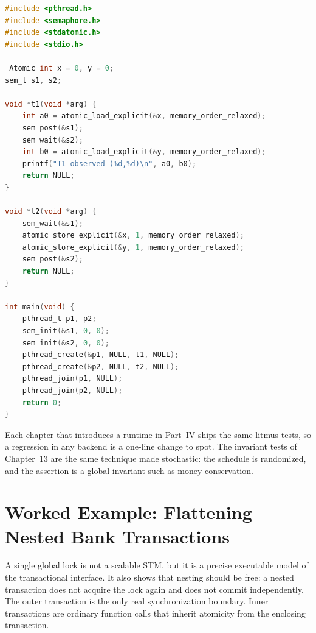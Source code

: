 \begin{lstlisting}[language=C, caption={A minimal litmus-test harness for the
serializable-but-not-opaque history. The schedule is fixed by two semaphores.},
label={lst:litmus-harness}]
#include <pthread.h>
#include <semaphore.h>
#include <stdatomic.h>
#include <stdio.h>

_Atomic int x = 0, y = 0;
sem_t s1, s2;

void *t1(void *arg) {
    int a0 = atomic_load_explicit(&x, memory_order_relaxed);
    sem_post(&s1);
    sem_wait(&s2);
    int b0 = atomic_load_explicit(&y, memory_order_relaxed);
    printf("T1 observed (%d,%d)\n", a0, b0);
    return NULL;
}

void *t2(void *arg) {
    sem_wait(&s1);
    atomic_store_explicit(&x, 1, memory_order_relaxed);
    atomic_store_explicit(&y, 1, memory_order_relaxed);
    sem_post(&s2);
    return NULL;
}

int main(void) {
    pthread_t p1, p2;
    sem_init(&s1, 0, 0);
    sem_init(&s2, 0, 0);
    pthread_create(&p1, NULL, t1, NULL);
    pthread_create(&p2, NULL, t2, NULL);
    pthread_join(p1, NULL);
    pthread_join(p2, NULL);
    return 0;
}
\end{lstlisting}

Each chapter that introduces a runtime in Part~IV ships the same litmus tests,
so a regression in any backend is a one-line change to spot. The invariant
tests of Chapter~13 are the same technique made stochastic: the schedule is
randomized, and the assertion is a global invariant such as money conservation.

\section{Worked Example: Flattening Nested Bank Transactions}

A single global lock is not a scalable STM, but it is a precise executable
model of the transactional interface. It also shows that nesting should be
free: a nested transaction does not acquire the lock again and does not commit
independently. The outer transaction is the only real synchronization
boundary. Inner transactions are ordinary function calls that inherit
atomicity from the enclosing transaction.

